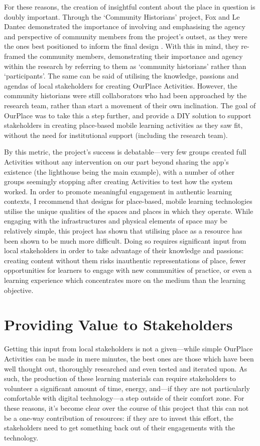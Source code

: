 For these reasons, the creation of insightful content about the place in question is doubly important. Through the `Community Historians' project, Fox and Le Dantec demonstrated the importance of involving and emphasising the agency and perspective of community members from the project's outset, as they were the ones best positioned to inform the final design \citep{Fox2014}. With this in mind, they re-framed the community members, demonstrating their importance and agency within the research by referring to them as `community historians' rather than `participants'. The same can be said of utilising the knowledge, passions and agendas of local stakeholders for creating OurPlace Activities. However, the community historians were still collaborators who had been approached by the research team, rather than start a movement of their own inclination. The goal of OurPlace was to take this a step further, and provide a DIY solution to support stakeholders in creating place-based mobile learning activities as they saw fit, without the need for institutional support (including the research team).

By this metric, the project's success is debatable---very few groups created full Activities without any intervention on our part beyond sharing the app's existence (the lighthouse being the main example), with a number of other groups seemingly stopping after creating Activities to test how the system worked. In order to promote meaningful engagement in authentic learning contexts, I recommend that designs for place-based, mobile learning technologies utilise the unique qualities of the spaces and places in which they operate. While engaging with the infrastructures and physical elements of space may be relatively simple, this project has shown that utilising place as a resource has been shown to be much more difficult. Doing so requires significant input from local stakeholders in order to take advantage of their knowledge and passions: creating content without them risks inauthentic representations of place, fewer opportunities for learners to engage with new communities of practice, or even a learning experience which concentrates more on the medium than the learning objective. 

\section{Providing Value to Stakeholders}

Getting this input from local stakeholders is not a given---while simple OurPlace Activities can be made in mere minutes, the best ones are those which have been well thought out, thoroughly researched and even tested and iterated upon. As such, the production of these learning materials can require stakeholders to volunteer a significant amount of time, energy, and---if they are not particularly comfortable with digital technology---a step outside of their comfort zone. For these reasons, it's become clear over the course of this project that this can not be a one-way contribution of resources: if they are to invest this effort, the stakeholders need to get something back out of their engagements with the technology.

